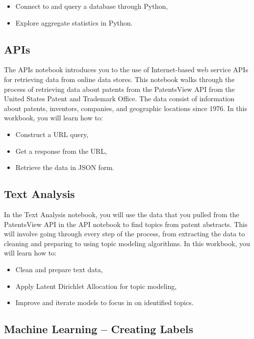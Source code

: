 \documentclass[]{krantz}
\begin{document}
\begin{itemize}
\item
  Connect to and query a database through Python,
\item
  Explore aggregate statistics in Python.
\end{itemize}

\subsection{APIs}\label{apis}

The APIs notebook introduces you to the use of Internet-based web
service APIs for retrieving data from online data stores. This notebook
walks through the process of retrieving data about patents from the
PatentsView API from the United States Patent and Trademark Office. The
data consist of information about patents, inventors, companies, and
geographic locations since 1976. In this workbook, you will learn how
to:

\begin{itemize}
\item
  Construct a URL query,
\item
  Get a response from the URL,
\item
  Retrieve the data in JSON form.
\end{itemize}

\subsection{Text Analysis}\label{text-analysis}

In the Text Analysis notebook, you will use the data that you pulled
from the PatentsView API in the API notebook to find topics from patent
abstracts. This will involve going through every step of the process,
from extracting the data to cleaning and preparing to using topic
modeling algorithms. In this workbook, you will learn how to:

\begin{itemize}
\item
  Clean and prepare text data,
\item
  Apply Latent Dirichlet Allocation for topic modeling,
\item
  Improve and iterate models to focus in on identified topics.
\end{itemize}

\subsection{Machine Learning -- Creating
Labels}\label{machine-learning-creating-labels}
\end{document}
